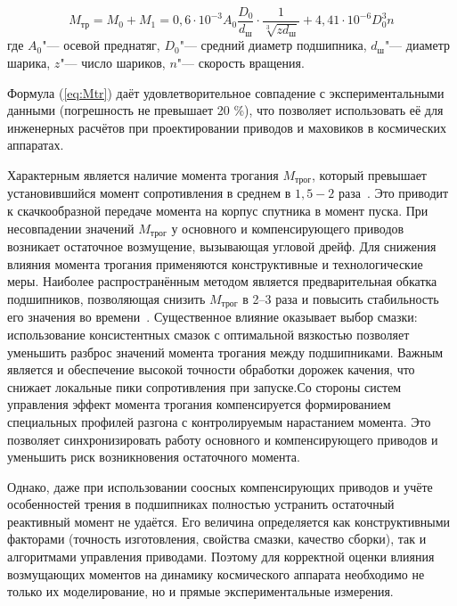 \begin{equation}
	\label{eq:Mtr}
	M_{\text{тр}} = M_0 + M_1 = 0{,}6 \cdot 10^{-3} A_0
	\frac{D_0}{d_{\text{ш}}} \cdot \frac{1}{\sqrt[3]{z d_{\text{ш}}}}+4{,}41 \cdot 10^{-6} D_0^3 n
\end{equation}
где \(A_0\)"--- осевой преднатяг, \(D_0\)"--- средний диаметр подшипника, \(d_{\text{ш}}\)"--- диаметр шарика, \(z\)"--- число шариков, \(n\)"--- скорость вращения.
	
Формула (\ref{eq:Mtr}) даёт удовлетворительное совпадение с экспериментальными данными (погрешность не превышает 20 \%), что позволяет использовать её для инженерных расчётов при проектировании приводов и маховиков в космических аппаратах.

Характерным является наличие момента трогания $M_{\text{трог}}$, который превышает установившийся момент сопротивления в среднем в $1,5-2$ раза~\cite{Mikhailov2014}. Это приводит к скачкообразной передаче момента на корпус спутника в момент пуска. При несовпадении значений $M_{\text{трог}}$ у основного и компенсирующего приводов возникает остаточное возмущение, вызывающая угловой дрейф. Для снижения влияния момента трогания применяются конструктивные и технологические меры. Наиболее распространённым методом является предварительная обкатка подшипников, позволяющая снизить $M_{\text{трог}}$ в 2–3 раза и повысить стабильность его значения во времени~\cite{Mikhailov2014}. Существенное влияние оказывает выбор смазки: использование консистентных смазок с оптимальной вязкостью позволяет уменьшить разброс значений момента трогания между подшипниками. Важным является и обеспечение высокой точности обработки дорожек качения, что снижает локальные пики сопротивления при запуске.Со стороны систем управления эффект момента трогания компенсируется формированием специальных профилей разгона с контролируемым нарастанием момента. Это позволяет синхронизировать работу основного и компенсирующего приводов и уменьшить риск возникновения остаточного момента.

Однако, даже при использовании соосных компенсирующих приводов и учёте особенностей трения в подшипниках полностью устранить остаточный реактивный момент не удаётся. Его величина определяется как конструктивными факторами (точность изготовления, свойства смазки, качество сборки), так и алгоритмами управления приводами. Поэтому для корректной оценки влияния возмущающих моментов на динамику космического аппарата необходимо не только их моделирование, но и прямые экспериментальные измерения.

